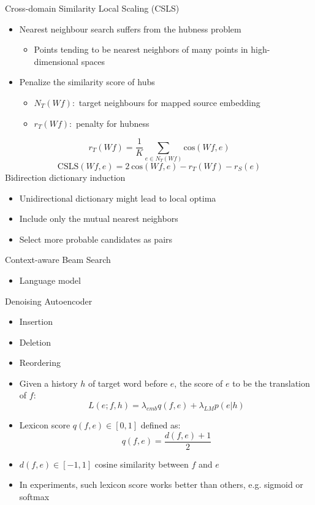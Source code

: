 \documentclass[11pt, a4paper, landscape]{article}
\begin{document}
	\vfill
	Cross-domain Similarity Local Scaling (CSLS)
	\begin{itemize}
		\item Nearest neighbour search suffers from the hubness problem
		\begin{itemize}
			\item Points tending to be nearest neighbors of many points in high-dimensional spaces
		\end{itemize}
		\item Penalize the similarity score of hubs
			\begin{itemize}
				\item $N_T(Wf):$ target neighbours for mapped source embedding
				\item $r_T(W f):$ penalty for hubness
			\end{itemize}
	\end{itemize}
	\[r_T(W f) = \frac{1}{K} \sum_{e \in N_T(Wf)}\textrm{cos}(Wf, e) \]
	\[ \textrm{CSLS}(Wf, e) = 2\ \textrm{cos}(Wf, e)-r_{T}(Wf)-r_{S}(e)\]
	Bidirection dictionary induction

	\begin{itemize}
		\item Unidirectional dictionary might lead to local optima
		\item Include only the mutual nearest neighbors
		\item Select more probable candidates as pairs   
	\end{itemize}
	\vfill
	
	\NewPage
	\vfill
	Context-aware Beam Search
	\begin{itemize}
		\item Language model\\
	\end{itemize}
	Denoising Autoencoder
	\begin{itemize}
		\item Insertion
		\item Deletion
		\item Reordering
	\end{itemize}	
	\vfill
		
	\NewPage
	
	\vfill
	
	\begin{itemize}
		\item Given a history $h$ of target word before $e$, the score of $e$ to be the translation of $f$:
		\[ L(e;f,h)=\lambda_{emb}q(f,e) + \lambda_{LM}p(e|h)\]
		\item Lexicon score $q(f,e) \in [0,1] $ defined as:
		\[ q(f,e)= \frac{d(f,e)+1}{2}\]
		\item $d(f,e)\in [-1,1]$ cosine similarity between $f$ and $e$
		\item In experiments, such lexicon score works better than others, e.g. sigmoid or softmax
	\end{itemize}	
	\vfill
	
\end{document}
